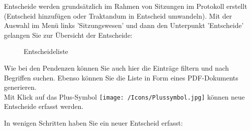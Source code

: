 Entscheide werden grundsätzlich im Rahmen von Sitzungen im Protokoll erstellt (Entscheid hinzufügen oder Traktandum in Entscheid umwandeln). 
Mit der Auswahl im Menü links 'Sitzungswesen' und dann den Unterpunkt 'Entscheide' gelangen Sie zur Übersicht der Entscheide:

\begin{figure}[H]
\caption{Entscheideliste}
\end{figure}

Wie bei den Pendenzen können Sie auch hier die Einträge filtern und nach Begriffen suchen. Ebenso können Sie die Liste in Form eines PDF-Dokuments generieren. \\

Mit Klick auf das Plus-Symbol \texttt{[image: /Icons/Plussymbol.jpg]} können neue Entscheide erfasst werden.

\vspace{\baselineskip}

In wenigen Schritten haben Sie ein neuer Entscheid erfasst:

\vspace{\baselineskip}

